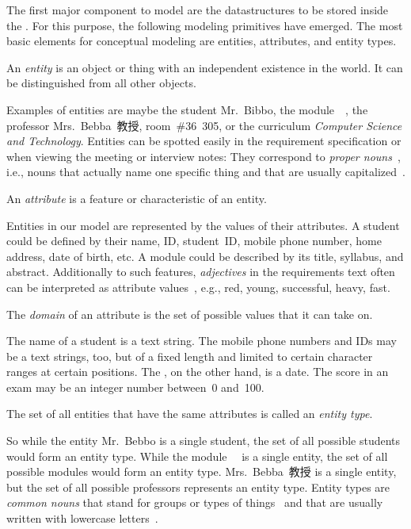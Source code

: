 %
%
\label{sec:entitisAttrsErd}%
%
The first major component to model are the datastructures to be stored inside the \db.
For this purpose, the following modeling primitives have emerged.
The most basic elements for conceptual modeling are entities, attributes, and entity types.%
%
\begin{definition}[Entity]%
\label{def:entity}%
An \emph{entity} is an object or thing with an independent existence in the world. %
It can be distinguished from all other objects.%
\end{definition}%
%
Examples of entities are maybe the student Mr.~Bibbo, the module~~\cite{programmingWithPython}, the professor Mrs.~Bebba~教授, room~\#36~305, or the curriculum \emph{Computer Science and Technology}.
Entities can be spotted easily in the requirement specification or when viewing the meeting or interview notes:
They correspond to \emph{proper nouns}~\cite{C1997ECAED}, i.e., nouns that actually name one specific thing and that are usually capitalized~\cite{EOWM2025MWAMTD:CAPNWTDLWOGC}.%
%
\begin{definition}[Attribute]%
An \emph{attribute} is a feature or characteristic of an entity.%
\end{definition}%
%
Entities in our model are represented by the values of their attributes.
A student could be defined by their name, ID, student~ID, mobile phone number, home address, date of birth, etc.
A module could be described by its title, syllabus, and abstract.
Additionally to such features, \emph{adjectives} in the requirements text often can be interpreted as attribute values~\cite{C1997ECAED}, e.g., red, young, successful, heavy, fast.%
%
\begin{definition}[Domain]%
The \emph{domain} of an attribute is the set of possible values that it can take on.%
\end{definition}%
%
The name of a student is a text string.
The mobile phone numbers and IDs may be a text strings, too, but of a fixed length and limited to certain character ranges at certain positions.
The , on the other hand, is a date.
The score in an exam may be an integer number between~0 and~100.%
%
\begin{definition}%
\label{def:entityType}%
The set of all entities that have the same attributes is called an \emph{entity type}.%
\end{definition}%
%
So while the entity Mr.~Bebbo is a single student, the set of all possible students would form an entity type.
While the module~~\cite{programmingWithPython} is a single entity, the set of all possible modules would form an entity type.
Mrs.~Bebba~教授 is a single entity, but the set of all possible professors represents an entity type.
Entity types are \emph{common nouns} that stand for groups or types of things~\cite{C1997ECAED} and that are usually written with lowercase letters~\cite{EOWM2025MWAMTD:CAPNWTDLWOGC}.

